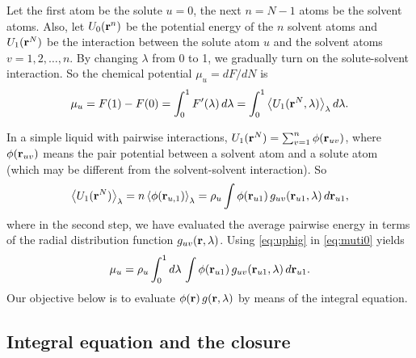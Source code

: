 \documentclass[10pt]{article}
\begin{document}
Let the first atom be the solute $u = 0$,
  the next $n = N - 1$ atoms be the solvent atoms.
Also,
  let $U_0(\mathbf{r}^n)$ be the potential energy of the $n$ solvent atoms
  and $U_1(\mathbf{r}^N)$ be the interaction between the solute atom $u$
  and the solvent atoms $v = 1, 2, \dots, n$.
By changing $\lambda$ from 0 to 1, we gradually turn on
  the solute-solvent interaction.
%
So the chemical potential $\mu_u = dF/dN$ is
\begin{align}
  \mu_u
  =
  F(1) - F(0)
  =
  \int_0^1 F'(\lambda) \, d\lambda
  =
  \int_0^1
    \left\langle
      U_1(\mathbf{r}^N, \lambda)
    \right\rangle_\lambda d\lambda.
  \label{eq:muti0}
\end{align}




In a simple liquid with pairwise interactions,
  $U_1(\mathbf{r}^N) = \sum_{v = 1}^{n} \phi(\mathbf{r}_{uv})$,
  where $\phi(\mathbf{r}_{uv})$ means the pair potential
  between a solvent atom and a solute atom
  (which may be different from the solvent-solvent
  interaction).
So
\begin{equation}
    \left\langle
      U_1(\mathbf{r}^N)
    \right\rangle_\lambda
    =
    n
    \left\langle
      \phi(\mathbf{r}_{u,1})
    \right\rangle_\lambda
    =
    \rho_u \int \phi(\mathbf{r}_{u1}) \, g_{uv}(\mathbf{r}_{u1}, \lambda) \, d\mathbf{r}_{u1},
  \label{eq:uphig}
\end{equation}
%
where in the second step, we have evaluated the average
pairwise energy in terms of the radial distribution function
$g_{uv}(\mathbf{r}, \lambda)$.
Using \eqref{eq:uphig} in \eqref{eq:muti0} yields
\begin{equation}
    \mu_u
    =
    \rho_u \int_0^1 d\lambda \,
      \int \phi(\mathbf{r}_{u1}) \, g_{uv}(\mathbf{r}_{u1}, \lambda) \, d\mathbf{r}_{u1}.
  \label{eq:muti}
\end{equation}
Our objective below is to evaluate
$\phi(\mathbf{r}) \, g(\mathbf{r}, \lambda)$
by means of the integral equation.




\subsection{Integral equation and the closure}
\end{document}
